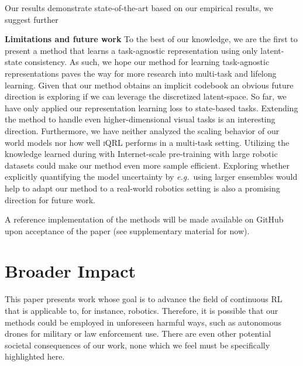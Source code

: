 \documentclass{article}
\makeatletter
\theoremstyle{plain}
\theoremstyle{definition}
\theoremstyle{remark}
\newcommand{\our}{\textsc{iQRL}\xspace}
\newcommand{\eg}{\textit{e.g.\@}\xspace}
\makeatother
\begin{document}
Our results demonstrate state-of-the-art
based on our empirical results, we suggest further

\textbf{Limitations and future work}
To the best of our knowledge, we are the first to present a method that learns a task-agnostic representation
using only latent-state consistency. As such, we hope our method for learning task-agnostic representations paves the
way for more research into multi-task and lifelong learning.
Given that our method obtains an implicit codebook an obvious future direction is exploring if we can leverage the
discretized latent-space. So far, we have only applied our representation learning loss to state-based tasks. Extending the method to handle even higher-dimensional visual tasks is an interesting direction. Furthermore, we have neither analyzed the scaling behavior of our world models nor how well \our performs in a multi-task setting. Utilizing the knowledge learned during with Internet-scale pre-training with large robotic datasets could make our method even more sample efficient. Exploring whether explicitly quantifying the model uncertainty by \eg\ using larger ensembles would help to adapt our method to a real-world robotics setting is also a promising direction for future work.


A reference implementation of the methods will be made available on GitHub upon acceptance of the paper (see supplementary material for now).



\section*{Broader Impact}
This paper presents work whose goal is to advance the field of continuous RL that is applicable to, for instance, robotics. Therefore, it is possible that our methods could be employed in unforeseen harmful ways, such as autonomous drones for military or law enforcement use. There are even other potential societal consequences of our work, none which we feel must be specifically highlighted here.






\newpage
\appendix
\onecolumn
\end{document}
